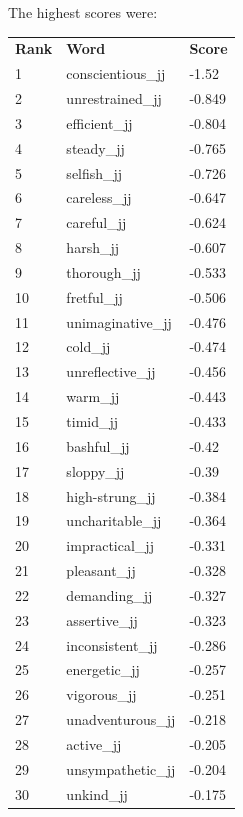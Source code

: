 \documentclass[10pt,letterpaper]{book}
\begin{document}
The highest scores were:
\begin{tabular}{ l l l }
        \textbf{Rank} & \textbf{Word} & \textbf{Score} \\
        1 & conscientious\_jj & -1.52 \\
        2 & unrestrained\_jj & -0.849 \\
        3 & efficient\_jj & -0.804 \\
        4 & steady\_jj & -0.765 \\
        5 & selfish\_jj & -0.726 \\
        6 & careless\_jj & -0.647 \\
        7 & careful\_jj & -0.624 \\
        8 & harsh\_jj & -0.607 \\
        9 & thorough\_jj & -0.533 \\
        10 & fretful\_jj & -0.506 \\
        11 & unimaginative\_jj & -0.476 \\
        12 & cold\_jj & -0.474 \\
        13 & unreflective\_jj & -0.456 \\
        14 & warm\_jj & -0.443 \\
        15 & timid\_jj & -0.433 \\
        16 & bashful\_jj & -0.42 \\
        17 & sloppy\_jj & -0.39 \\
        18 & high-strung\_jj & -0.384 \\
        19 & uncharitable\_jj & -0.364 \\
        20 & impractical\_jj & -0.331 \\
        21 & pleasant\_jj & -0.328 \\
        22 & demanding\_jj & -0.327 \\
        23 & assertive\_jj & -0.323 \\
        24 & inconsistent\_jj & -0.286 \\
        25 & energetic\_jj & -0.257 \\
        26 & vigorous\_jj & -0.251 \\
        27 & unadventurous\_jj & -0.218 \\
        28 & active\_jj & -0.205 \\
        29 & unsympathetic\_jj & -0.204 \\
        30 & unkind\_jj & -0.175 \\
\end{tabular}
\end{document}

